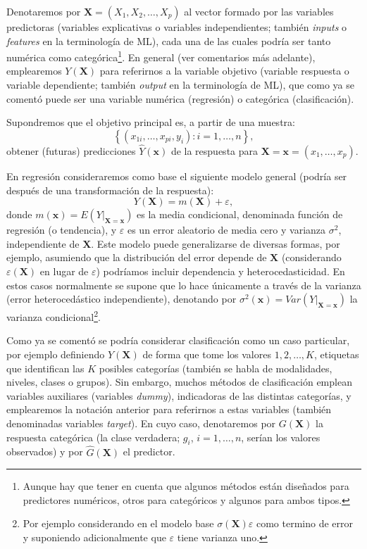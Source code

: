 \documentclass[
  spanish,
]{book}
\theoremstyle{break}
\theoremstyle{definition}
\theoremstyle{definition}
\theoremstyle{definition}
\theoremstyle{definition}
\theoremstyle{remark}
\begin{document}
Denotaremos por \(\mathbf{X}=(X_1, X_2, \ldots, X_p)\) al vector formado por las variables predictoras
(variables explicativas o variables independientes; también \emph{inputs} o \emph{features} en la terminología de ML), cada una de las cuales podría ser tanto numérica como categórica\footnote{Aunque hay que tener en cuenta que algunos métodos están diseñados para predictores numéricos, otros para categóricos y algunos para ambos tipos.}.
En general (ver comentarios más adelante), emplearemos \(Y\left(\mathbf{X} \right)\) para referirnos a la variable objetivo (variable respuesta o variable dependiente; también \emph{output} en la terminología de ML), que como ya se comentó puede ser una variable numérica (regresión) o categórica (clasificación).

Supondremos que el objetivo principal es, a partir de una muestra:
\[\left\{ \left( x_{1i}, \ldots, x_{pi}, y_{i} \right)  : i = 1, \ldots, n \right\},\]
obtener (futuras) predicciones \(\hat Y\left(\mathbf{x} \right)\) de la respuesta para \(\mathbf{X}=\mathbf{x}=\left(x_{1}, \ldots, x_{p}\right)\).

En regresión consideraremos como base el siguiente modelo general (podría ser después de una transformación de la respuesta):
\begin{equation} 
  Y(\mathbf{X})=m(\mathbf{X})+\varepsilon,
  \label{eq:modelogeneral}
\end{equation}
donde \(m(\mathbf{x}) = E\left( \left. Y\right\vert_{\mathbf{X}=\mathbf{x}} \right)\) es la media condicional, denominada función de regresión (o tendencia), y \(\varepsilon\) es un error aleatorio de media cero y varianza \(\sigma^2\), independiente de \(\mathbf{X}\).
Este modelo puede generalizarse de diversas formas, por ejemplo, asumiendo que la distribución del error depende de \(\mathbf{X}\) (considerando \(\varepsilon(\mathbf{X})\) en lugar de \(\varepsilon\)) podríamos incluir dependencia y heterocedasticidad.
En estos casos normalmente se supone que lo hace únicamente a través de la varianza (error heterocedástico independiente), denotando por \(\sigma^2(\mathbf{x}) = Var\left( \left. Y\right\vert_{\mathbf{X}=\mathbf{x}} \right)\) la varianza condicional\footnote{Por ejemplo considerando en el modelo base \(\sigma(\mathbf{X})\varepsilon\) como termino de error y suponiendo adicionalmente que \(\varepsilon\) tiene varianza uno.}.

Como ya se comentó se podría considerar clasificación como un caso particular, por ejemplo definiendo \(Y\left(\mathbf{X} \right)\) de forma que tome los valores \(1, 2, \ldots, K\), etiquetas que identifican las \(K\) posibles categorías (también se habla de modalidades, niveles, clases o grupos).
Sin embargo, muchos métodos de clasificación emplean variables auxiliares (variables \emph{dummy}), indicadoras de las distintas categorías, y emplearemos la notación anterior para referirnos a estas variables (también denominadas variables \emph{target}). En cuyo caso, denotaremos por \(G \left(\mathbf{X} \right)\) la respuesta categórica (la clase verdadera; \(g_i\), \(i =1, \ldots, n\), serían los valores observados) y por \(\hat G \left(\mathbf{X} \right)\) el predictor.
\end{document}
